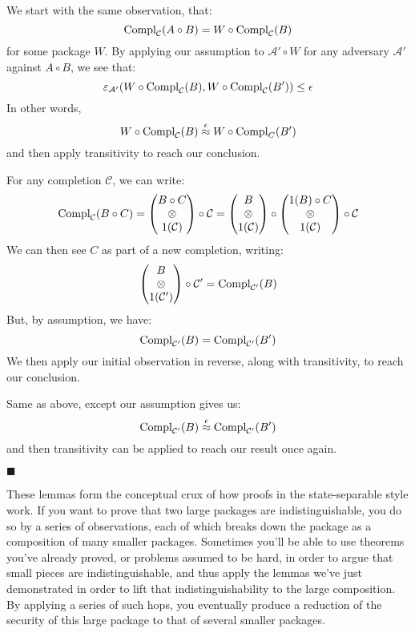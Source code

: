 \begin{lemma}
     We start with the same observation, that:
    $$
    \text{Compl}_{\mathcal{C}}(A \circ B) = W \circ \text{Compl}_{\mathcal{C}}(B)
    $$
    for some package $W$.
    By applying our assumption to $\mathcal{A}' \circ W$ for any adversary
    $\mathcal{A}'$ against $A \circ B$, we see that:
    $$
    \varepsilon_{\mathcal{A}'}(W \circ \text{Compl}_{\mathcal{C}}(B), W \circ \text{Compl}_{\mathcal{C}}(B')) \leq \epsilon
    $$
    In other words,
    $$
    W \circ \text{Compl}_{\mathcal{C}}(B) \overset{\epsilon}{\approx} W \circ \text{Compl}_{C}(B')
    $$
    and then apply transitivity to reach our conclusion.

     For any completion $\mathcal{C}$, we can write:
    $$
    \text{Compl}_{\mathcal{C}}(B \circ C) =
    \begin{pmatrix}
        B \circ C\cr
        \otimes\cr
        1(\mathcal{C})
    \end{pmatrix}
    \circ \mathcal{C}
    =
    \begin{pmatrix}
        B\cr
        \otimes\cr
        1(\mathcal{C})
    \end{pmatrix}
    \circ
    \begin{pmatrix}
        1(B) \circ C\cr
        \otimes\cr
        1(\mathcal{C})
    \end{pmatrix}
    \circ \mathcal{C}
    $$
    We can then see $C$ as part of a new completion, writing:
    $$
    \begin{pmatrix}
        B\cr
        \otimes\cr
        1(\mathcal{C}')
    \end{pmatrix}
    \circ \mathcal{C}'
    = \text{Compl}_{\mathcal{C}'}(B)
    $$
    But, by assumption, we have:
    $$
    \text{Compl}_{\mathcal{C}'}(B) = 
    \text{Compl}_{\mathcal{C}'}(B')
    $$
    We then apply our initial observation in reverse, along with transitivity,
    to reach our conclusion.

     Same as above, except our assumption gives us:
    $$
    \text{Compl}_{\mathcal{C}'}(B) \overset{\epsilon}{\approx}
    \text{Compl}_{\mathcal{C}'}(B')
    $$
    and then transitivity can be applied to reach our result once again.

    $\blacksquare$
\end{lemma}

These lemmas form the conceptual crux of how proofs in the state-separable
style work.
If you want to prove that two large packages
are indistinguishable, you do so by a series of observations,
each of which breaks down the package as a composition
of many smaller packages.
Sometimes you'll be able to use theorems you've already proved,
or problems assumed to be hard, in order to argue
that small pieces are indistinguishable, and thus apply
the lemmas we've just demonstrated in order
to lift that indistinguishability to the large composition.
By applying a series of such hops, you eventually
produce a reduction of the security of this large package
to that of several smaller packages.

